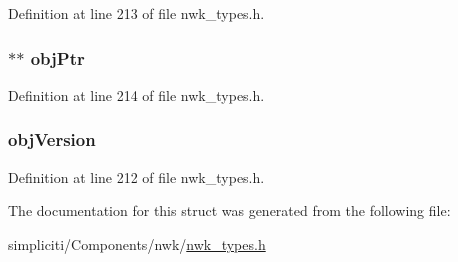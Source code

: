 \-Definition at line 213 of file nwk\-\_\-types.\-h.

\hypertarget{structioctlNVObj__t_a949432122afe3e9a023a8ffb333e81d4}{
\subsubsection[{obj\-Ptr}]{$\ast$$\ast$ {\bf obj\-Ptr}}}\label{structioctlNVObj__t_a949432122afe3e9a023a8ffb333e81d4}


\-Definition at line 214 of file nwk\-\_\-types.\-h.

\hypertarget{structioctlNVObj__t_a822a4cb6fbb3487cd295d0620a299c02}{
\subsubsection[{obj\-Version}]{ {\bf obj\-Version}}}\label{structioctlNVObj__t_a822a4cb6fbb3487cd295d0620a299c02}


\-Definition at line 212 of file nwk\-\_\-types.\-h.



\-The documentation for this struct was generated from the following file\-:\begin{DoxyCompactItemize}
\item 
simpliciti/\-Components/nwk/\hyperlink{nwk__types_8h}{nwk\-\_\-types.\-h}\end{DoxyCompactItemize}

